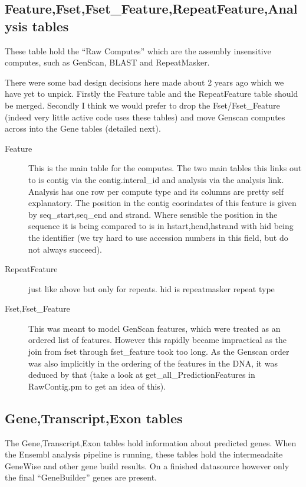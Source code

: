 \documentclass[11pt,a4paper]{article}
\begin{document}
\subsection{Feature,Fset,Fset\_Feature,RepeatFeature,Analysis tables}

These table hold the ``Raw Computes'' which are the assembly insensitive computes,
such as GenScan, BLAST and RepeatMasker. 

There were some bad design decisions here made about 2 years ago which
we have yet to unpick. Firstly the Feature table and the RepeatFeature
table should be merged.  Secondly I think we would prefer to drop the
Fset/Fset\_Feature (indeed very little active code uses these tables)
and move Genscan computes across into the Gene tables (detailed next).

\begin{description}
\item[Feature] This is the main table for the computes. The two main tables this
links out to is contig via the contig.interal\_id and analysis via the analysis
link. Analysis has one row per compute type and its columns are pretty self
explanatory. The position in the contig coorindates of this feature is given
by seq\_start,seq\_end and strand. Where sensible the position in the sequence
it is being compared to is in hstart,hend,hstrand with hid being the identifier
(we try hard to use accession numbers in this field, but do not always succeed).
\item[RepeatFeature] just like above but only for repeats. hid is repeatmasker repeat
type
\item[Fset,Fset\_Feature] This was meant to model GenScan features,
which were treated as an ordered list of features. However this
rapidly became impractical as the join from fset through fset\_feature
took too long. As the Genscan order was also implicitly in the
ordering of the features in the DNA, it was deduced by that (take a look
at get\_all\_PredictionFeatures in RawContig.pm to get an idea of this). 
\end{description}

\subsection{Gene,Transcript,Exon tables}

The Gene,Transcript,Exon tables hold information about predicted genes. When the
Ensembl analysis pipeline is running, these tables hold the intermeadaite 
GeneWise and other gene build results. On a finished datasource however only
the final ``GeneBuilder'' genes are present.
\end{document}
